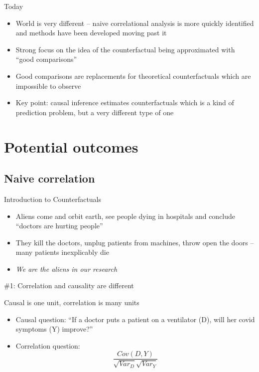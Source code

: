 \documentclass{beamer}
\begin{document}
\begin{frame}{Today}

\begin{itemize}
\item World is very different -- naive correlational analysis is more quickly identified and methods have been developed moving past it
\item Strong focus on the idea of the counterfactual being approximated with ``good comparisons''
\item Good comparisons are replacements for theoretical counterfactuals which are impossible to observe
\item Key point: causal inference estimates counterfactuals which is a kind of prediction problem, but a very different type of one
\end{itemize}

\end{frame}

\section{Potential outcomes}

\subsection{Naive correlation}

\begin{frame}{Introduction to Counterfactuals}

  \begin{itemize}
    \item Aliens come and orbit earth, see people dying in hospitals and conclude ``doctors are hurting people''
    \item They kill the doctors, unplug patients from machines, throw open the doors -- many patients inexplicably die
    \item \emph{We are the aliens in our research}
  \end{itemize}

\end{frame}

\begin{frame}{\#1: Correlation and causality are different}

  Causal is one unit, correlation is many units
  \begin{itemize}
    \item Causal question: ``If a doctor puts a patient on a ventilator (D), will her covid symptoms (Y) improve?''
    \item Correlation question:  $$\frac{Cov(D,Y)}{\sqrt{Var_D}\sqrt{{Var_Y}}}$$
  \end{itemize}

\end{frame}
\end{document}
